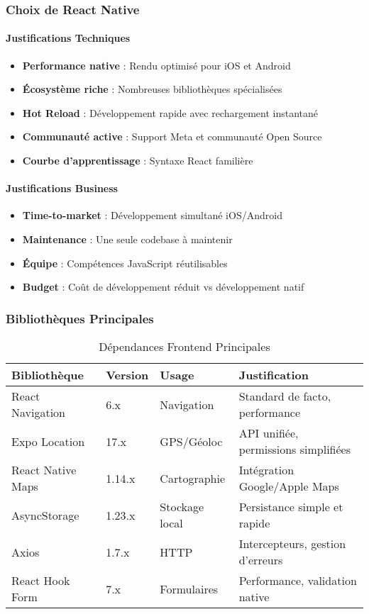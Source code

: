 \subsubsection{Choix de React Native}

\paragraph{Justifications Techniques}
\begin{itemize}
    \item \textbf{Performance native} : Rendu optimisé pour iOS et Android
    \item \textbf{Écosystème riche} : Nombreuses bibliothèques spécialisées
    \item \textbf{Hot Reload} : Développement rapide avec rechargement instantané
    \item \textbf{Communauté active} : Support Meta et communauté Open Source
    \item \textbf{Courbe d'apprentissage} : Syntaxe React familière
\end{itemize}

\paragraph{Justifications Business}
\begin{itemize}
    \item \textbf{Time-to-market} : Développement simultané iOS/Android
    \item \textbf{Maintenance} : Une seule codebase à maintenir
    \item \textbf{Équipe} : Compétences JavaScript réutilisables
    \item \textbf{Budget} : Coût de développement réduit vs développement natif
\end{itemize}

\subsubsection{Bibliothèques Principales}

\begin{table}[H]
\centering
\begin{tabular}{|l|l|l|p{5cm}|}
\hline
\textbf{Bibliothèque} & \textbf{Version} & \textbf{Usage} & \textbf{Justification} \\
\hline
React Navigation & 6.x & Navigation & Standard de facto, performance \\
Expo Location & 17.x & GPS/Géoloc & API unifiée, permissions simplifiées \\
React Native Maps & 1.14.x & Cartographie & Intégration Google/Apple Maps \\
AsyncStorage & 1.23.x & Stockage local & Persistance simple et rapide \\
Axios & 1.7.x & HTTP & Intercepteurs, gestion d'erreurs \\
React Hook Form & 7.x & Formulaires & Performance, validation native \\
\hline
\end{tabular}
\caption{Dépendances Frontend Principales}
\end{table}

